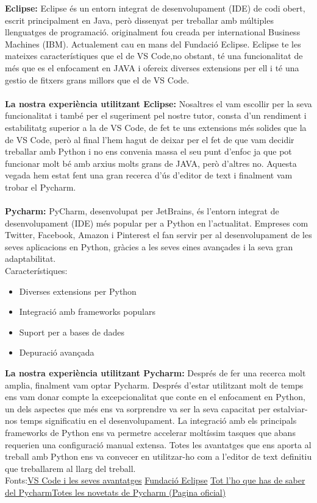 \textbf{Eclipse:}
Eclipse és un entorn integrat de desenvolupament (IDE) de codi obert, escrit principalment en Java, però dissenyat per treballar amb múltiples llenguatges de programació. originalment fou creada per international Business Machines (IBM). Actualement cau en mans del Fundació Eclipse. Eclipse te les mateixes característiques que el de VS Code,no obstant, té una funcionalitat de més que es el enfocament en JAVA i ofereix diverses extensions per ell i té una gestio de fitxers grans millors que el de VS  Code. \\ \\
\textbf{La nostra experiència utilitzant Eclipse:}
Nosaltres el vam escollir per la seva funcionalitat i també per el sugeriment pel nostre tutor, consta d'un rendiment i estabilitatg superior a la de VS Code, de fet te uns extensions més solides que la de VS Code, però al final l'hem hagut de deixar per el fet de que vam decidir treballar amb Python i no ens convenia massa el seu punt d'enfoc ja que pot funcionar molt bé amb arxius molts grans de JAVA, però d'altres no. Aquesta vegada hem estat fent una gran recerca d'ús d'editor de text i finalment vam trobar el Pycharm. \\ \\
\textbf{Pycharm:}
PyCharm, desenvolupat per JetBrains, és l'entorn integrat de desenvolupament (IDE) més popular per a Python en l'actualitat. Empreses com Twitter, Facebook, Amazon i Pinterest el fan servir per al desenvolupament de les seves aplicacions en Python, gràcies a les seves eines avançades i la seva gran adaptabilitat.\\
Característiques:
\begin{itemize}
 \item Diverses extensions per Python
 \item Integració amb frameworks populars
 \item Suport per a bases de dades
 \item Depuració avançada
\end{itemize}
\textbf{La nostra experiència utilitzant Pycharm:}
Després de fer una recerca molt amplia, finalment vam optar Pycharm. Després d'estar utilitzant molt de temps ens vam donar compte la excepcionalitat que conte en el enfocament en Python, un dels aspectes que més ens va sorprendre va ser la seva capacitat per estalviar-nos temps significatiu en el desenvolupament. La integració amb els principals frameworks de Python ens va permetre accelerar moltíssim tasques que abans requerien una configuració manual extensa.  Totes les avantatges que ens aporta al treball amb Python  ens va convecer en utilitzar-ho com a l'editor de text definitiu que treballarem al llarg del treball.\\
Fonts:\href{https://www.arsys.es/blog/que-es-visual-studio-code-y-cuales-son-sus-ventajas}{VS Code i les seves avantatges} \href{https://www.eclipse.org/}{Fundació Eclipse} \href{https://datascientest.com/es/pycharm}{Tot l'ho que has de saber del Pycharm}\href{https://www.jetbrains.com/pycharm/whatsnew/#}{Totes les novetats de Pycharm (Pagina oficial)}

